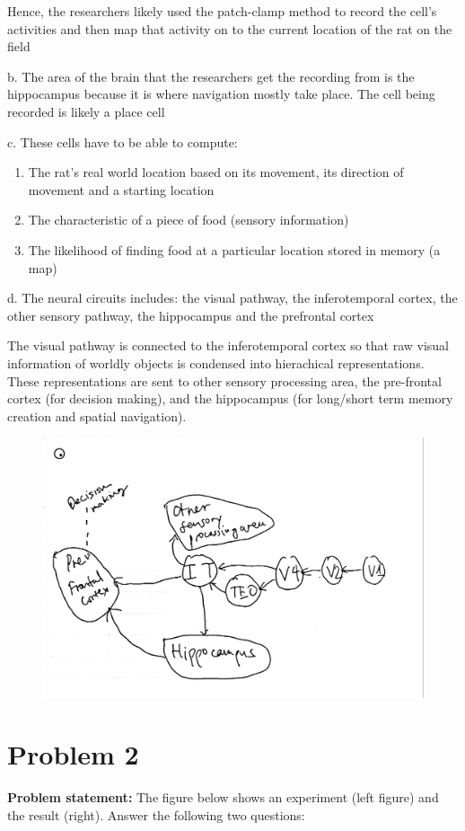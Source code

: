 \documentclass[letterpaper, 11pt]{article}
\begin{document}
Hence, the researchers likely used the patch-clamp method to record the cell's activities and then map that activity on to the current location of the rat on the field

b. The area of the brain that the researchers get the recording from is the hippocampus because it is where navigation mostly take place. The cell being recorded is likely a place cell

c. These cells have to be able to compute:

\begin{enumerate}
	\item The rat's real world location based on its movement, its direction of movement and a starting location
	\item The characteristic of a piece of food (sensory information)
	\item The likelihood of finding food at a particular location stored in memory (a map)
\end{enumerate}

d. The neural circuits includes: the visual pathway, the inferotemporal cortex, the other sensory pathway, the hippocampus and the prefrontal cortex

The visual pathway is connected to the inferotemporal cortex so that raw visual information of worldly objects is condensed into hierachical representations. These representations are sent to other sensory processing area, the pre-frontal cortex (for decision making), and the hippocampus (for long/short term memory creation and spatial navigation).

\begin{figure}[htb!]
	\centering
	\includegraphics[width=0.8\linewidth]{prob1d.jpg}
	\label{fig1d}
\end{figure}

\section{Problem 2}
\label{sec:prob2}
\textbf{Problem statement:} The figure below shows an experiment (left figure) and the result (right). Answer the following two questions: 
\end{document}
